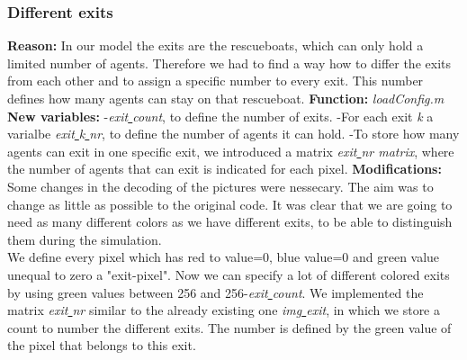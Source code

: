 \documentclass[11pt]{article}
\begin{document}
\subsubsection{Different exits}
\textbf{Reason:}
\newline
In our model the exits are the rescueboats, which can only hold a limited number of agents. Therefore we had to find a way how to differ the exits from each other and to assign a specific number to every exit. This number defines how many agents can stay on that rescueboat.
\newline
\textbf{Function:}
\newline
\textit{loadConfig.m}
\newline
\textbf{New variables:}
\newline
-\textit{exit\underline{ }count}, to define the number of exits.\newline
-For each exit \textit{k} a varialbe \textit{exit\underline{ }k\underline{ }nr}, to define the number of agents it can hold.\newline
-To store how many agents can exit in one specific exit, we introduced a matrix \textit{exit\underline{ }nr matrix}, where the number of agents that can exit is indicated for each pixel.
\newline
\textbf{Modifications:}
\newline 
Some changes in the decoding of the pictures were nessecary. The aim was to change as little as possible to the original code. It was clear that we are going to need as many different colors as we have different exits, to be able to distinguish them during the simulation.
\\
We define every pixel which has red to value=0, blue value=0 and green value unequal to zero a "exit-pixel". Now we can specify a lot of different colored exits by using green values between 256 and 256-\textit{exit\underline{ }count}.
\newline
We implemented the matrix \textit{exit\underline{ }nr} similar to the already existing one \textit{img\underline{ }exit}, in which we store a count to number the different exits. The number is defined by the green value of the pixel that belongs to this exit.

\end{document}
